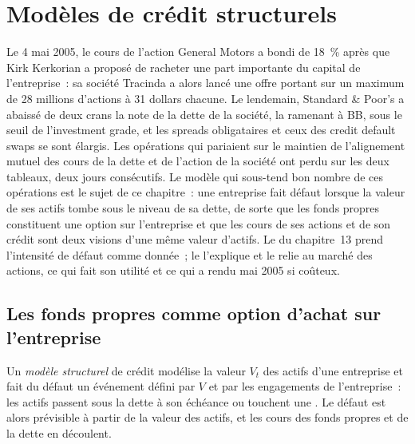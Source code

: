 \chapter{Modèles de crédit structurels}\label{ch:rc:structural-credit-models}

Le 4 mai 2005, le cours de l'action General Motors a bondi de 18~\% après que Kirk Kerkorian a proposé de racheter
une part importante du capital de l'entreprise~: sa société Tracinda a alors lancé une offre portant sur un maximum de 28 millions d'actions à 31
dollars chacune. Le lendemain, Standard \& Poor's a abaissé de deux
crans la note de la dette de la société, la ramenant à BB, sous le seuil de l'investment grade, et les spreads obligataires et ceux des credit default swaps se sont élargis.
Les opérations qui pariaient sur le maintien de l'alignement mutuel des cours de la dette et
de l'action de la société ont perdu sur les deux tableaux, deux jours consécutifs. Le modèle qui sous-tend bon nombre de ces opérations est le
sujet de ce chapitre~: une entreprise fait défaut lorsque la valeur de ses actifs tombe sous le niveau de sa
dette, de sorte que les fonds propres constituent une option sur l'entreprise et que les cours de ses actions et de son
crédit sont deux visions d'une même valeur d'actifs. Le  du chapitre~13
prend l'intensité de défaut comme donnée~; le  l'explique et le relie au
marché des actions, ce qui fait son utilité et ce qui a rendu mai 2005 si coûteux.

\section{Les fonds propres comme option d'achat sur l'entreprise}

\begin{definition}\label{def:rc:structural-credit-models:structural}
Un \emph{modèle structurel} de crédit modélise la valeur $V_t$ des actifs
d'une entreprise et fait du défaut un événement défini par $V$ et par les engagements de l'entreprise~:
les actifs passent sous la dette à son échéance ou touchent une . Le défaut est alors
prévisible à partir de la valeur des actifs, et les cours des fonds propres et de la dette en découlent.
\end{definition}

